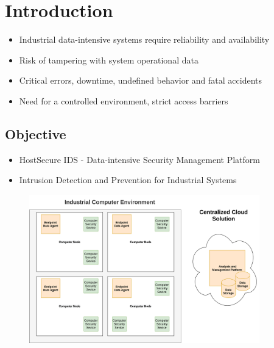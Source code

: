 \section{Introduction}
\begin{frame}{\insertsection}
    \begin{itemize}
        \item Industrial  data-intensive  systems  require reliability and  availability
        \item Risk of tampering with system operational data
        \item Critical errors, downtime, undefined behavior and fatal accidents
        \item Need for a controlled environment, strict access barriers
    \end{itemize}
\end{frame}

\subsection{Objective}
\begin{frame}{\insertsubsection}
    \begin{itemize}
        \item HostSecure IDS - Data-intensive Security Management Platform
        \item Intrusion Detection and Prevention for Industrial Systems
    \end{itemize}
    
    \begin{figure}[h]
        \centering
        \includegraphics[width=10cm]{img/hostsecure-concept_pp.png}
        \label{fig:concept}
    \end{figure}
\end{frame}

